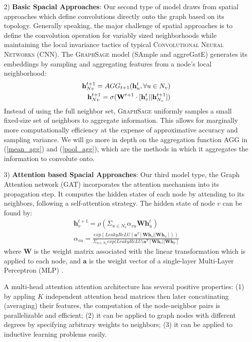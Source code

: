 \documentclass[sigconf, nonacm]{acmart}
\begin{document}
2) \textbf{Basic Spacial Approaches}: 
Our second type of model draws from spatial approaches which define convolutions directly onto the graph based on its topology. Generally speaking, the major challenge of spatial approaches is to define the convolution operation for variably sized neighborhoods while maintaining the local invariance tactics of typical \textsc{Convolutional Neural Networks (CNN)}.
The \textsc{GraphSage} model (SAmple and aggreGatE) \cite{Hamiltonetal.2017} generates its embeddings by sampling and aggregating features from a node’s local neighborhood:
\begin{align} 
    \mathbf{h}_{Nv}^{t+1} = AGG_{t+1}({\mathbf{h}_u^{t}, \forall u \in N_v}) \\
    \mathbf{h}_{Nv}^{t+1} = \sigma(\mathbf{W}^{t+1} \cdot [\mathbf{h}^t_v || \mathbf{h}^{t+1}_{N_v}])
    \label{\textsc{GraphSage}_eq}
\end{align} 
Instead of using the full neighbor set, \textsc{GraphSage} uniformly samples a small fixed-size set of neighbors to aggregate information. This allows for marginally more computationally efficiency at the expense of approximative accuracy and sampling variance. We will go more in depth on the aggregation function AGG in (\ref{mean_agg}) and (\ref{pool_agg}), which are the methods in which it aggregates the information to convolute onto. 

3) \textbf{Attention based Spacial Approaches}:  Our third model type, the Graph Attention network (GAT) \cite{Velickovic2017} incorporates the attention mechanism into its propagation step. It computes the hidden states of each node by attending to its neighbors, following a self-attention strategy. The hidden state of node $v$ can be found by:
\begin{align} 
    \mathbf{h}_v^{t+1} = \rho (\Sigma_{u \in N_v} \alpha_{vu}\mathbf{W}\mathbf{h}^t_u)\\
    \alpha_{vu} = \frac{exp(LeakyReLU(\mathbf{a}^T [\mathbf{W}\mathbf{h}_v || \mathbf{W}\mathbf{h}_u] ))}{\Sigma_{u \in N_v} exp(LeakyReLU(\mathbf{a}^T [\mathbf{W}\mathbf{h}_v || \mathbf{W}\mathbf{h}_k]}
    \label{attention}
\end{align} 
where $\mathbf{W}$ is the weight matrix associated with the linear transformation which is applied to each node, and $\mathbf{a}$ is the weight vector of a single-layer Multi-Layer Perceptron (MLP) \cite{Hinton1985}.

A multi-head attention attention architecture has several positive properties: (1) by appling $K$ independent attention head matrices then later concatinating (averaging) their features, the computation of the node-neighbor pairs is parallelizable and efficient; (2) it can be applied to graph nodes with different degrees by specifying arbitrary weights to neighbors; (3) it can be applied to inductive learning problems easily.
\end{document}
